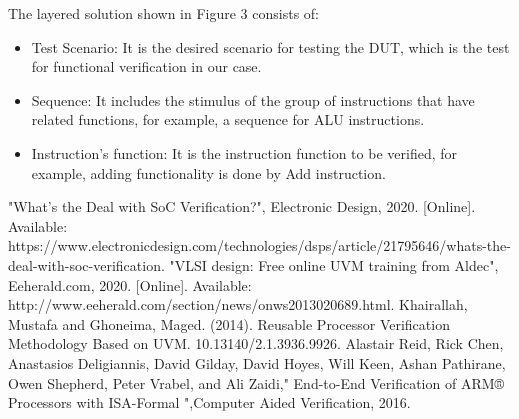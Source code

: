\documentclass[conference,10 pt,twoside]{IEEEtran}
\begin{document}
The layered solution shown in Figure 3 consists of:\begin{itemize}
\item Test Scenario: \newline It is the desired scenario for testing the DUT, which is the test for functional verification in our case.
\item Sequence: \newline It includes the stimulus of the group of instructions that have related functions, for example, a sequence for ALU instructions.
\item Instruction's function: \newline It is the instruction function to be verified, for example, adding functionality is done by Add instruction.
\end{itemize}

\begin{thebibliography}{00}
%
{} "What’s the Deal with SoC Verification?", Electronic Design, 2020. [Online]. Available: https://www.electronicdesign.com/technologies/dsps/article/21795646/whats-the-deal-with-soc-verification.
\newline
{} "VLSI design: Free online UVM training from Aldec", Eeherald.com, 2020. [Online]. Available: http://www.eeherald.com/section/news/onws2013020689.html.
\newline
{} Khairallah, Mustafa and Ghoneima, Maged. (2014). Reusable Processor Verification Methodology Based on UVM. 10.13140/2.1.3936.9926.
\newline
{} Alastair Reid, Rick Chen, Anastasios Deligiannis, David Gilday, David Hoyes, Will Keen, Ashan Pathirane, Owen Shepherd, Peter Vrabel, and Ali Zaidi," End-to-End Veriﬁcation of ARM® Processors with ISA-Formal ",Computer Aided Veriﬁcation, 2016.
\newline
\end{thebibliography}
\end{document}
